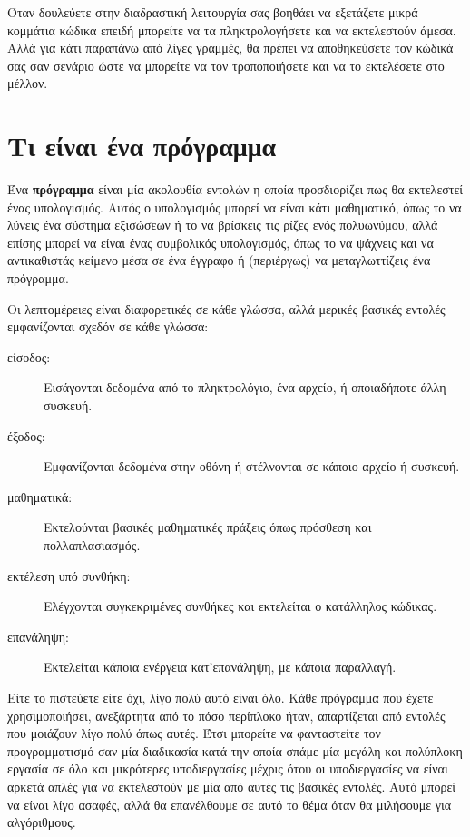 \documentclass[10pt]{book}
\newcommand{\en}{\selectlanguage{english}}
\newcommand{\gr}{\selectlanguage{greek}}
\begin{document}

\gr Όταν δουλεύετε στην διαδραστική λειτουργία σας βοηθάει να εξετάζετε
μικρά κομμάτια κώδικα επειδή μπορείτε να τα πληκτρολογήσετε και να εκτελεστούν
άμεσα. Αλλά για κάτι παραπάνω από λίγες γραμμές, θα πρέπει να αποθηκεύσετε τον
κώδικά σας σαν σενάριο ώστε να μπορείτε να τον τροποποιήσετε και να το εκτελέσετε
στο μέλλον.


\section{ Τι είναι ένα πρόγραμμα}

Ένα {\bf πρόγραμμα} είναι μία ακολουθία εντολών η οποία προσδιορίζει
πως θα εκτελεστεί ένας υπολογισμός. Αυτός ο υπολογισμός μπορεί να είναι
κάτι μαθηματικό, όπως το να λύνεις ένα σύστημα εξισώσεων ή το να βρίσκεις
τις ρίζες ενός πολυωνύμου, αλλά επίσης μπορεί να είναι ένας συμβολικός
υπολογισμός, όπως το να ψάχνεις και να αντικαθιστάς κείμενο μέσα σε ένα
έγγραφο ή (περιέργως) να μεταγλωττίζεις ένα πρόγραμμα.

\gr
Οι λεπτομέρειες είναι διαφορετικές σε κάθε γλώσσα, αλλά μερικές βασικές
εντολές εμφανίζονται σχεδόν σε κάθε γλώσσα:

\begin{description}
\item[είσοδος:]   Εισάγονται δεδομένα από το πληκτρολόγιο, ένα αρχείο, ή οποιαδήποτε
άλλη συσκευή.

\item[έξοδος:]   Εμφανίζονται δεδομένα στην οθόνη ή στέλνονται σε κάποιο αρχείο
ή συσκευή.

\item[μαθηματικά:]   Εκτελούνται βασικές μαθηματικές πράξεις όπως πρόσθεση και
πολλαπλασιασμός.

\item[εκτέλεση υπό συνθήκη:]	  Ελέγχονται συγκεκριμένες συνθήκες και εκτελείται
ο κατάλληλος κώδικας.

\item[επανάληψη:]   Εκτελείται κάποια ενέργεια κατ'επανάληψη, με κάποια παραλλαγή.

\end{description}
\gr
Eίτε το πιστεύετε είτε όχι, λίγο πολύ αυτό είναι όλο. Κάθε πρόγραμμα
που έχετε χρησιμοποιήσει, ανεξάρτητα από το πόσο περίπλοκο ήταν,
απαρτίζεται από εντολές που μοιάζουν λίγο πολύ όπως αυτές. Έτσι
μπορείτε να φανταστείτε τον προγραμματισμό σαν μία διαδικασία κατά
την οποία σπάμε μία μεγάλη και πολύπλοκη εργασία σε όλο και μικρότερες
υποδιεργασίες μέχρις ότου οι υποδιεργασίες να είναι αρκετά απλές για
να εκτελεστούν με μία από αυτές τις βασικές εντολές.
\en {}
\gr
Αυτό μπορεί να είναι λίγο ασαφές, αλλά θα επανέλθουμε σε αυτό το θέμα
όταν θα μιλήσουμε για αλγόριθμους.
\end{document}
